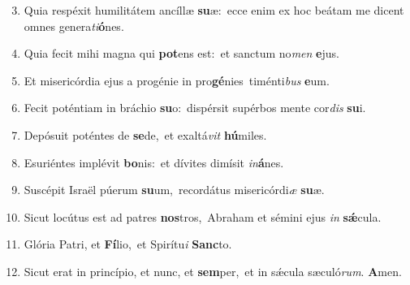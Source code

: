 \begin{enumerate}
    \setcounter{enumi}{2}

    \item Quia respéxit humilitátem ancíllæ \textbf{su}æ:~\redgreheightstar ecce enim ex hoc beátam me dicent omnes genera\textit{ti}\textbf{ó}nes.

    \item Quia fecit mihi magna qui \textbf{pot}ens est:~\redgreheightstar et sanctum no\textit{men} \textbf{e}jus.

    \item Et misericórdia ejus a progénie in pro\textbf{gé}nies~\redgreheightstar timénti\textit{bus} \textbf{e}um.

    \item Fecit poténtiam in bráchio \textbf{su}o:~\redgreheightstar dispérsit supérbos mente cor\textit{dis} \textbf{su}i.

    \item Depósuit poténtes de \textbf{se}de,~\redgreheightstar et exaltá\textit{vit} \textbf{hú}miles.

    \item Esuriéntes implévit \textbf{bo}nis:~\redgreheightstar et dívites dimísit \textit{in}\textbf{á}nes.

    \item Suscépit Israël púerum \textbf{su}um,~\redgreheightstar recordátus misericórdi\textit{æ} \textbf{su}æ.

    \item Sicut locútus est ad patres \textbf{nos}tros,~\redgreheightstar Abraham et sémini ejus \textit{in} \textbf{sǽ}cula.

    \item Glória Patri, et \textbf{Fí}lio,~\redgreheightstar et Spirítu\textit{i} \textbf{Sanc}to.

    \item Sicut erat in princípio, et nunc, et \textbf{sem}per,~\redgreheightstar et in sǽcula sæculó\textit{rum}. \textbf{A}men.

\end{enumerate}
